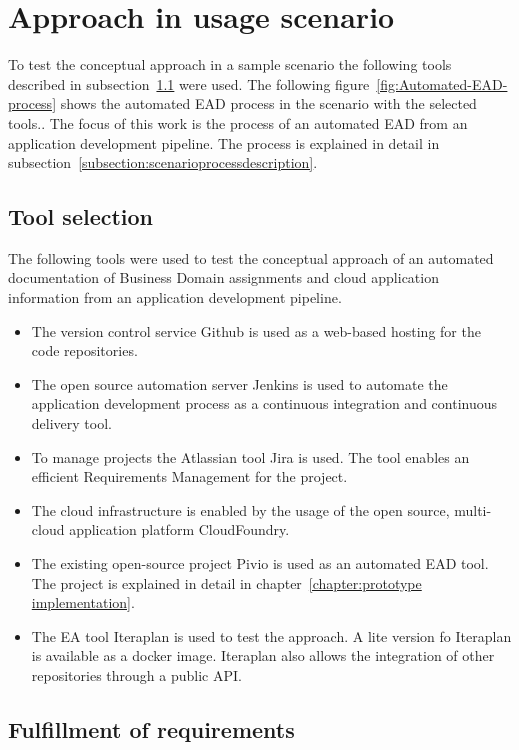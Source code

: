 \section{Approach in usage scenario}\label{section:approach-usage-scenario}

To test the conceptual approach in a sample scenario the following tools described in subsection~\ref{subsection:toolselection} were used. The following figure~\ref{fig:Automated-EAD-process} shows the automated EAD process in the scenario with the selected tools.. The focus of this work is the process of an automated EAD from an application development pipeline. The process is explained in detail in subsection~\ref{subsection:scenarioprocessdescription}.

\subsection{Tool selection}\label{subsection:toolselection}

The following tools were used to test the conceptual approach of an automated documentation of Business Domain assignments and cloud application information from an application development pipeline.
\begin{itemize}
    \item The version control service Github is used as a web-based hosting for the code repositories.
    \item The open source automation server Jenkins is used to automate the application development process as a continuous integration and continuous delivery tool.
    \item To manage projects the Atlassian tool Jira is used. The tool enables an efficient Requirements Management for the project. \cite{Filion2017}
    \item The cloud infrastructure is enabled by the usage of the open source, multi-cloud application platform CloudFoundry.
    \item The existing open-source project Pivio is used as an automated EAD tool. The project is explained in detail in chapter~\ref{chapter:prototype implementation}.
    \item The EA tool Iteraplan is used to test the approach. A lite version fo Iteraplan is available as a docker image. Iteraplan also allows the integration of other repositories through a public API.
\end{itemize}

\subsection{Fulfillment of requirements}\label{subsection:fulfillmentrequirements}

